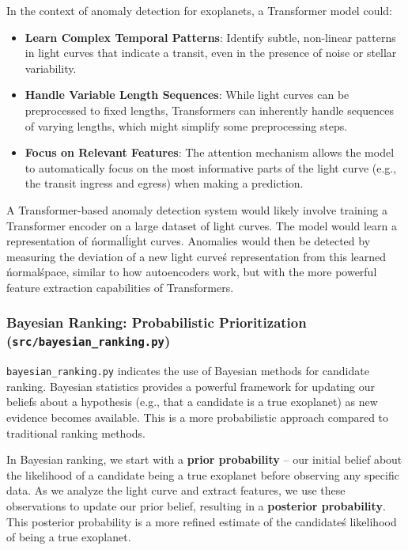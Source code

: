 \documentclass{article}
\begin{document}
In the context of anomaly detection for exoplanets, a Transformer model could:

\begin{itemize}
    \item \textbf{Learn Complex Temporal Patterns}: Identify subtle, non-linear patterns in light curves that indicate a transit, even in the presence of noise or stellar variability.
    \item \textbf{Handle Variable Length Sequences}: While light curves can be preprocessed to fixed lengths, Transformers can inherently handle sequences of varying lengths, which might simplify some preprocessing steps.
    \item \textbf{Focus on Relevant Features}: The attention mechanism allows the model to automatically focus on the most informative parts of the light curve (e.g., the transit ingress and egress) when making a prediction.
\end{itemize}

A Transformer-based anomaly detection system would likely involve training a Transformer encoder on a large dataset of light curves. The model would learn a representation of \'normal\' light curves. Anomalies would then be detected by measuring the deviation of a new light curve\'s representation from this learned \'normal\' space, similar to how autoencoders work, but with the more powerful feature extraction capabilities of Transformers.

\subsubsection{Bayesian Ranking: Probabilistic Prioritization (\texttt{src/bayesian\_ranking.py})}

\texttt{bayesian\_ranking.py} indicates the use of Bayesian methods for candidate ranking. Bayesian statistics provides a powerful framework for updating our beliefs about a hypothesis (e.g., that a candidate is a true exoplanet) as new evidence becomes available. This is a more probabilistic approach compared to traditional ranking methods.

In Bayesian ranking, we start with a \textbf{prior probability} – our initial belief about the likelihood of a candidate being a true exoplanet before observing any specific data. As we analyze the light curve and extract features, we use these observations to update our prior belief, resulting in a \textbf{posterior probability}. This posterior probability is a more refined estimate of the candidate\'s likelihood of being a true exoplanet.
\end{document}
